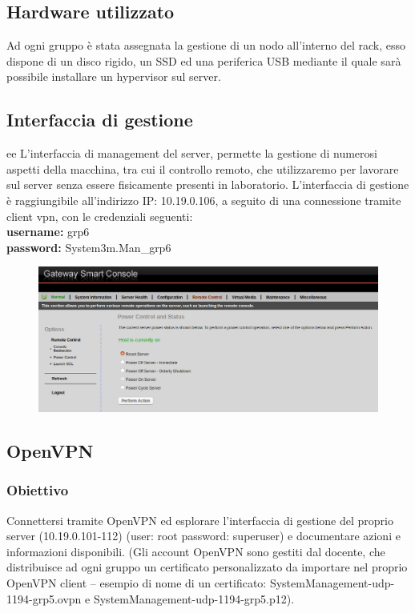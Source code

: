 \documentclass{article}
\begin{document}
\subsection{Hardware utilizzato}
Ad ogni gruppo è stata assegnata la gestione di un nodo all'interno del rack, esso dispone di un disco rigido, un SSD ed una periferica USB mediante il quale sarà possibile installare un hypervisor sul server.

\subsection{Interfaccia di gestione}ee
L'interfaccia di management del server, permette la gestione di numerosi aspetti della macchina, tra cui il controllo remoto, che utilizzaremo per lavorare sul server senza essere fisicamente presenti in laboratorio.
L'interfaccia di gestione è raggiungibile all'indirizzo IP: 10.19.0.106, a seguito di una connessione tramite client vpn, con le credenziali seguenti: \\  \textbf{username:} grp6 \\ \textbf{password:} System3m.Man\_grp6
\begin{figure}[H]
    \center
    \includegraphics[scale=0.37]{images/GUIManagement.png}
\end{figure}

\subsection{OpenVPN}
\subsubsection{Obiettivo}
Connettersi tramite OpenVPN ed esplorare l’interfaccia di gestione del proprio
server (10.19.0.101-112) (user: root password: superuser) e documentare
azioni e informazioni disponibili.
(Gli account OpenVPN sono gestiti dal docente, che distribuisce ad ogni gruppo
un certificato personalizzato da importare nel proprio OpenVPN client – esempio
di nome di un certificato: SystemManagement-udp-1194-grp5.ovpn e
SystemManagement-udp-1194-grp5.p12).
\end{document}
